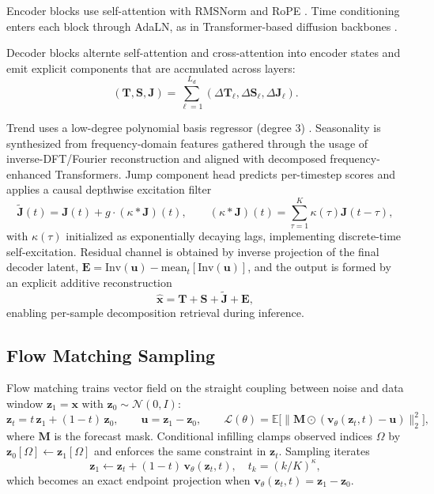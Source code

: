 Encoder blocks use self-attention
with RMSNorm \cite{zhang2019rmsnorm} and RoPE
\cite{su2021roformer}. Time conditioning enters each block through AdaLN,
as in Transformer-based diffusion backbones \cite{peebles2023dit}.

Decoder blocks alternte self-attention and cross-attention into encoder states and emit explicit
components that are accmulated across layers:
\[
(\mathbf{T},\mathbf{S},\mathbf{J})=\sum_{\ell=1}^{L_d}(\Delta\mathbf{T}_\ell,\Delta\mathbf{S}_\ell,\Delta\mathbf{J}_\ell).
\]

Trend uses a low-degree polynomial basis regressor (degree $3$) \cite{oreshkin2019nbeats}. Seasonality is synthesized from
frequency-domain features gathered through the usage of inverse-DFT/Fourier reconstruction \cite{zhou2022fedformer} and aligned with decomposed
frequency-enhanced Transformers. Jump component head \cite{hawkes1971spectra} predicts per-timestep scores
and applies a causal depthwise excitation filter
\[
\widetilde{\mathbf{J}}(t)=\mathbf{J}(t)+g\cdot(\kappa*\mathbf{J})(t),
\qquad
(\kappa*\mathbf{J})(t)=\sum_{\tau=1}^{K}\kappa(\tau)\mathbf{J}(t-\tau),
\]
with $\kappa(\tau)$ initialized as exponentially decaying lags, implementing discrete-time
self-excitation. Residual channel \cite{zhou2022fedformer,peebles2023dit} is obtained by inverse projection of the final decoder latent,
$\mathbf{E}=\mathrm{Inv}(\mathbf{u})-\mathrm{mean}_t[\mathrm{Inv}(\mathbf{u})]$, and the output is
formed by an explicit additive reconstruction
\[
\widehat{\mathbf{x}}=\mathbf{T}+\mathbf{S}+\widetilde{\mathbf{J}}+\mathbf{E},
\]
enabling per-sample decomposition retrieval during inference.

\subsection{Flow Matching Sampling}

Flow matching trains vector field on the straight coupling between noise and data window
$\mathbf{z}_1=\mathbf{x}$ with $\mathbf{z}_0\sim\mathcal{N}(0,I)$:
\[
    \mathbf{z}_t=t\,\mathbf{z}_1+(1-t)\,\mathbf{z}_0,\qquad
    \mathbf{u}=\mathbf{z}_1-\mathbf{z}_0,\qquad
    \mathcal{L}(\theta)=\mathbb{E}\big[\|\mathbf{M}\odot(\mathbf{v}_\theta(\mathbf{z}_t,t)-\mathbf{u})\|_2^2\big],
    \]
    where $\mathbf{M}$ is the forecast mask. Conditional infilling clamps observed indices
    $\Omega$ by $\mathbf{z}_0[\Omega]\leftarrow \mathbf{z}_1[\Omega]$ and enforces the same constraint in
    $\mathbf{z}_t$. Sampling iterates
    \[
        \mathbf{z}_1 \leftarrow \mathbf{z}_t+(1-t)\,\mathbf{v}_\theta(\mathbf{z}_t,t),
        \quad t_k=(k/K)^\kappa,
        \]
        which becomes an exact endpoint projection when $\mathbf{v}_\theta(\mathbf{z}_t,t)=\mathbf{z}_1-\mathbf{z}_0$.

